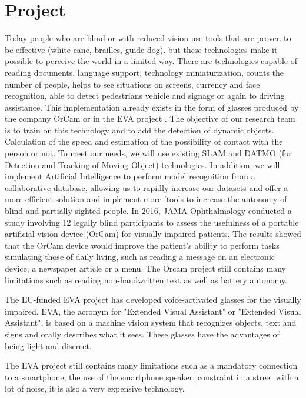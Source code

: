 \documentclass[conference,compsoc]{IEEEtran}
\begin{document}
\section{Project}
Today people who are blind or with reduced vision use tools that are proven to be effective (white cane, brailles, guide dog). but these technologies make it possible to perceive the world in a limited way.
There are technologies capable of reading documents, language support, technology miniaturization, counts the number of people, helps to see situations on screens, currency and face recognition, able to detect pedestrians vehicle and signage or again to driving assistance. This implementation already exists in the form of glasses produced by the company OrCam \cite{orcam_2021} or in the EVA project \cite{eva}.
The objective of our research team is to train on this technology and to add the detection of dynamic objects. Calculation of the speed and estimation of the possibility of contact with the person or not.
To meet our needs, we will use existing SLAM and DATMO (for Detection and Tracking of Moving Object) \cite{Pancham2011-11} technologies. In addition, we will implement Artificial Intelligence to perform model recognition from a collaborative database, allowing us to rapidly increase our datasets and offer a more efficient solution and implement more 'tools to increase the autonomy of blind and partially sighted people.
In 2016, JAMA Ophthalmology \cite{adrienne_w.scott_2016} conducted a study involving 12 legally blind participants to assess the usefulness of a portable artificial vision device (OrCam) for visually impaired patients. The results showed that the OrCam \cite{orcam_2021} device would improve the patient's ability to perform tasks simulating those of daily living, such as reading a message on an electronic device, a newspaper article or a menu.
The Orcam \cite{orcam_2021} project still contains many limitations such as reading non-handwritten text as well as battery autonomy.
 
The EU-funded EVA project \cite{eva} has developed voice-activated glasses for the visually impaired. EVA, the acronym for "Extended Visual Assistant" or "Extended Visual Assistant", is based on a machine vision system that recognizes objects, text and signs and orally describes what it sees. These glasses have the advantages of being light and discreet.

The EVA project \cite{eva} still contains many limitations such as a mandatory connection to a smartphone, the use of the smartphone speaker, constraint in a street with a lot of noise, it is also a very expensive technology.
\end{document}
